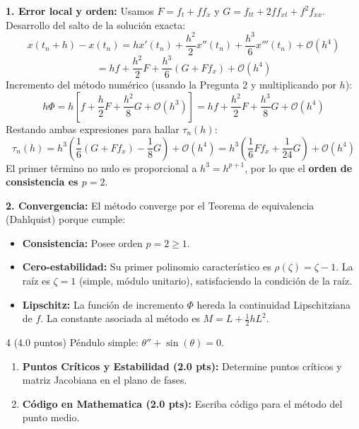 \begin{sol}
\textbf{1. Error local y orden:}
Usamos $F = f_t + f f_x$ y $G = f_{tt} + 2f f_{xt} + f^2 f_{xx}$.
Desarrollo del salto de la solución exacta:
$$ x(t_n+h) - x(t_n) = h x'(t_n) + \frac{h^2}{2} x''(t_n) + \frac{h^3}{6} x'''(t_n) + \mathcal{O}(h^4) $$
$$ = h f + \frac{h^2}{2}F + \frac{h^3}{6}(G + F f_x) + \mathcal{O}(h^4) $$
Incremento del método numérico (usando la Pregunta 2 y multiplicando por $h$):
$$ h\Phi = h \left[ f + \frac{h}{2}F + \frac{h^2}{8}G + \mathcal{O}(h^3) \right] = hf + \frac{h^2}{2}F + \frac{h^3}{8}G + \mathcal{O}(h^4) $$
Restando ambas expresiones para hallar $\tau_n(h)$:
$$ \tau_n(h) = h^3 \left( \frac{1}{6}(G + F f_x) - \frac{1}{8}G \right) + \mathcal{O}(h^4) = h^3 \left( \frac{1}{6}F f_x + \frac{1}{24}G \right) + \mathcal{O}(h^4) $$
El primer término no nulo es proporcional a $h^3 = h^{p+1}$, por lo que el \textbf{orden de consistencia es $p=2$}.

\textbf{2. Convergencia:}
El método converge por el Teorema de equivalencia (Dahlquist) porque cumple:
\begin{itemize}[label=-]
    \item \textbf{Consistencia:} Posee orden $p=2 \ge 1$.
    \item \textbf{Cero-estabilidad:} Su primer polinomio característico es $\rho(\zeta) = \zeta - 1$. La raíz es $\zeta=1$ (simple, módulo unitario), satisfaciendo la condición de la raíz.
    \item \textbf{Lipschitz:} La función de incremento $\Phi$ hereda la continuidad Lipschitziana de $f$. La constante asociada al método es $M = L + \frac{1}{2}h L^2$.
\end{itemize}
\end{sol}

\begin{ejer}{4 (4.0 puntos)}
Péndulo simple: $\theta'' + \sin(\theta) = 0$.
\begin{enumerate}
    \item \textbf{Puntos Críticos y Estabilidad (2.0 pts):} Determine puntos críticos y matriz Jacobiana en el plano de fases.
    \item \textbf{Código en Mathematica (2.0 pts):} Escriba código para el método del punto medio.
\end{enumerate}
\end{ejer}

